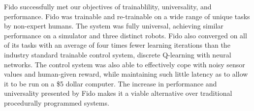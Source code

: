 Fido successfully met our objectives of trainablility, universality, and performance.
Fido was trainable and re-trainable on a wide range of unique tasks by non-expert humans.
The system was fully universal, achieving similar performance on a simulator and three distinct robots.
Fido also converged on all of its tasks with an average of four times fewer learning iterations than the industry standard trainable control system, discrete Q-learning with neural networks.
The control system was also able to effectively cope with noisy sensor values and human-given reward, while maintaining such little latency as to allow it to be run on a \$5 dollar computer.
The increase in performance and universality presented by Fido makes it a viable alternative over traditional procedurally programmed systems.

